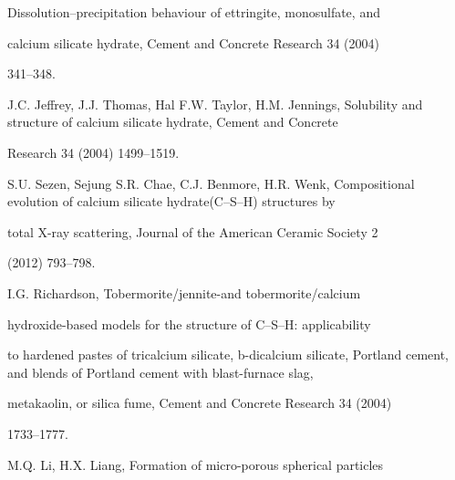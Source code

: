 \documentclass[a4paper,portrait,12pt]{article}
\begin{document}
\begin{flushleft}
Dissolution--precipitation behaviour of ettringite, monosulfate, and
\end{flushleft}


\begin{flushleft}
calcium silicate hydrate, Cement and Concrete Research 34 (2004)
\end{flushleft}


341--348.


\begin{flushleft}
[17] J.C. Jeffrey, J.J. Thomas, Hal F.W. Taylor, H.M. Jennings, Solubility and structure of calcium silicate hydrate, Cement and Concrete
\end{flushleft}


\begin{flushleft}
Research 34 (2004) 1499--1519.
\end{flushleft}


\begin{flushleft}
[18] S.U. Sezen, Sejung S.R. Chae, C.J. Benmore, H.R. Wenk, Compositional evolution of calcium silicate hydrate(C--S--H) structures by
\end{flushleft}


\begin{flushleft}
total X-ray scattering, Journal of the American Ceramic Society 2
\end{flushleft}


(2012) 793--798.


\begin{flushleft}
[19] I.G. Richardson, Tobermorite/jennite-and tobermorite/calcium
\end{flushleft}


\begin{flushleft}
hydroxide-based models for the structure of C--S--H: applicability
\end{flushleft}


\begin{flushleft}
to hardened pastes of tricalcium silicate, b-dicalcium silicate, Portland cement, and blends of Portland cement with blast-furnace slag,
\end{flushleft}


\begin{flushleft}
metakaolin, or silica fume, Cement and Concrete Research 34 (2004)
\end{flushleft}


1733--1777.


\begin{flushleft}
[20] M.Q. Li, H.X. Liang, Formation of micro-porous spherical particles
\end{flushleft}
\end{document}
